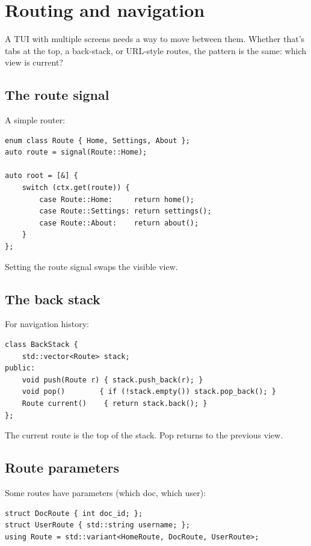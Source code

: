 \chapter{Routing and navigation}
\label{ch:routing}

\begin{aside}
A TUI with multiple screens needs a way to move between them.
Whether that's tabs at the top, a back-stack, or URL-style
routes, the pattern is the same: which view is current?
\end{aside}

\section{The route signal}

A simple router:

\begin{lstlisting}
enum class Route { Home, Settings, About };
auto route = signal(Route::Home);

auto root = [&] {
    switch (ctx.get(route)) {
        case Route::Home:     return home();
        case Route::Settings: return settings();
        case Route::About:    return about();
    }
};
\end{lstlisting}

Setting the route signal swaps the visible view.

\section{The back stack}

For navigation history:

\begin{lstlisting}
class BackStack {
    std::vector<Route> stack;
public:
    void push(Route r) { stack.push_back(r); }
    void pop()        { if (!stack.empty()) stack.pop_back(); }
    Route current()    { return stack.back(); }
};
\end{lstlisting}

The current route is the top of the stack. Pop returns to
the previous view.

\section{Route parameters}

Some routes have parameters (which doc, which user):

\begin{lstlisting}
struct DocRoute { int doc_id; };
struct UserRoute { std::string username; };
using Route = std::variant<HomeRoute, DocRoute, UserRoute>;
\end{lstlisting}


